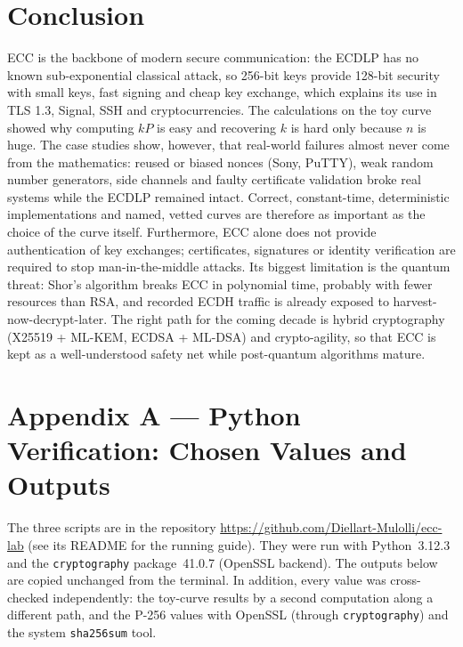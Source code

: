 \documentclass[11pt,a4paper]{article}
\begin{document}
\section*{Conclusion}
ECC is the backbone of modern secure communication: the ECDLP has no known sub-exponential classical attack, so
256-bit keys provide 128-bit security with small keys, fast signing and cheap key exchange, which explains its use in
TLS 1.3, Signal, SSH and cryptocurrencies. The calculations on the toy curve showed why computing $kP$ is easy and
recovering $k$ is hard only because $n$ is huge. The case studies show, however, that real-world failures almost never
come from the mathematics: reused or biased nonces (Sony, PuTTY), weak random number generators, side channels and
faulty certificate validation broke real systems while the ECDLP remained intact. Correct, constant-time, deterministic
implementations and named, vetted curves are therefore as important as the choice of the curve itself. Furthermore, ECC
alone does not provide authentication of key exchanges; certificates, signatures or identity verification are required to stop
man-in-the-middle attacks. Its biggest limitation is the quantum threat: Shor's algorithm breaks ECC in polynomial time,
probably with fewer resources than RSA, and recorded ECDH traffic is already exposed to harvest-now-decrypt-later.
The right path for the coming decade is hybrid cryptography (X25519 + ML-KEM, ECDSA + ML-DSA) and crypto-agility, so
that ECC is kept as a well-understood safety net while post-quantum algorithms mature.

\clearpage
\section*{Appendix A --- Python Verification: Chosen Values and Outputs}
The three scripts are in the repository \url{https://github.com/Diellart-Mulolli/ecc-lab} (see its README for the
running guide). They were run with Python~3.12.3 and the \texttt{cryptography} package~41.0.7 (OpenSSL backend).
The outputs below are copied unchanged from the terminal. In addition, every value was cross-checked independently:
the toy-curve results by a second computation along a different path, and the P-256 values with OpenSSL
(through \texttt{cryptography}) and the system \texttt{sha256sum} tool.
\end{document}
